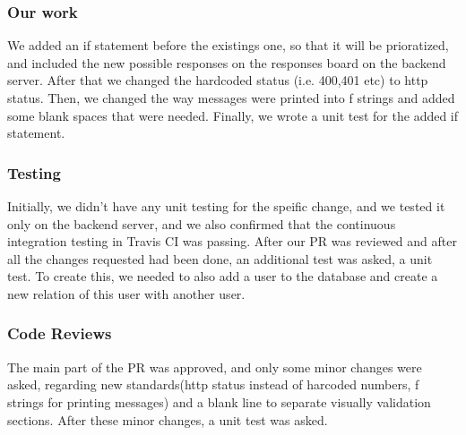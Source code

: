 \documentclass{article}
\begin{document}
\subsubsection{Our work}

We added an if statement before the existings one, so that it will be prioratized, and included the new possible responses on the responses board on the backend server. After that we changed the hardcoded status (i.e. 400,401 etc) to http status. Then, we changed the way messages were printed into f strings and added some blank spaces that were needed. Finally, we wrote a unit test for the added if statement.

\subsubsection{Testing}
Initially, we didn't have any unit testing for the speific change, and we tested it only on the backend server, and we also confirmed that the continuous integration testing in Travis CI was passing. 
After our PR was reviewed and after all the changes requested had been done, an additional test was asked, a unit test. To create this, we needed to also add a user to the database and create a new relation of this user with another user.

\subsubsection{Code Reviews}
The main part of the PR was approved, and only some minor changes were asked, regarding new standards(http status instead of harcoded numbers, f strings for printing messages) and a blank line to separate visually validation sections. After these minor changes, a unit test was asked.
\end{document}
